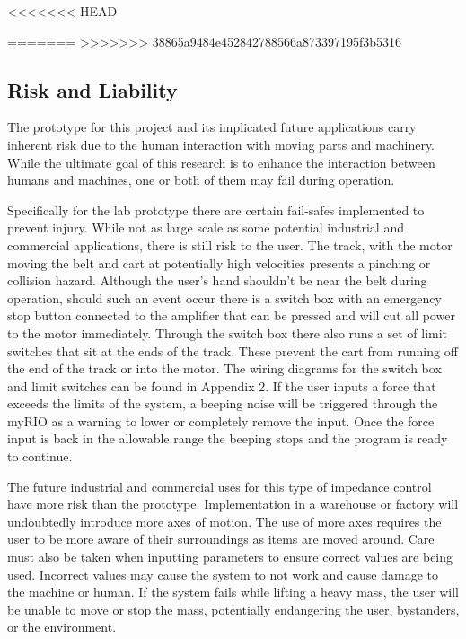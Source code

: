 <<<<<<< HEAD

=======
>>>>>>> 38865a9484e452842788566a873397195f3b5316
\subsection*{Risk and Liability}
The prototype for this project and its implicated future applications carry inherent risk due to the human interaction with moving parts and machinery. While the ultimate goal of this research is to enhance the interaction between humans and machines, one or both of them may fail during operation.

Specifically for the lab prototype there are certain fail-safes implemented to prevent injury. While not as large scale as some potential industrial and commercial applications, there is still risk to the user. The track, with the motor moving the belt and cart at potentially high velocities presents a pinching or collision hazard. Although the user's hand shouldn't be near the belt during operation, should such an event occur there is a switch box with an emergency stop button connected to the amplifier that can be pressed and will cut all power to the motor immediately. Through the switch box there also runs a set of limit switches that sit at the ends of the track. These prevent the cart from running off the end of the track or into the motor. The wiring diagrams for the switch box and limit switches can be found in Appendix 2. If the user inputs a force that exceeds the limits of the system, a beeping noise will be triggered through the myRIO as a warning to lower or completely remove the input. Once the force input is back in the allowable range the beeping stops and the program is ready to continue.

The future industrial and commercial uses for this type of impedance control have more risk than the prototype. Implementation in a warehouse or factory will undoubtedly introduce more axes of motion. The use of more axes requires the user to be more aware of their surroundings as items are moved around. Care must also be taken when inputting parameters to ensure correct values are being used. Incorrect values may cause the system to not work and cause damage to the machine or human. If the system fails while lifting a heavy mass, the user will be unable to move or stop the mass, potentially endangering the user, bystanders, or the environment.
